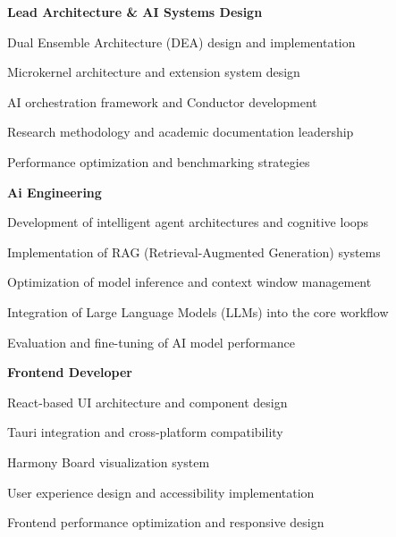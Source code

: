 \begin{description}[leftmargin=4cm,labelwidth=3.5cm]
    \item[\textbf{AMR MUHMAED FATHY}] \textbf{Lead Architecture \& AI Systems Design}
    \begin{compactlist}
        \item Dual Ensemble Architecture (DEA) design and implementation
        \item Microkernel architecture and extension system design
        \item AI orchestration framework and Conductor development
        \item Research methodology and academic documentation leadership
        \item Performance optimization and benchmarking strategies
    \end{compactlist}
    
    \item[\textbf{Mostafa Mohamed Abdullah Ali}] \textbf{Ai Engineering}
    \begin{compactlist}
        \item Development of intelligent agent architectures and cognitive loops
        \item Implementation of RAG (Retrieval-Augmented Generation) systems
        \item Optimization of model inference and context window management
        \item Integration of Large Language Models (LLMs) into the core workflow
        \item Evaluation and fine-tuning of AI model performance
    \end{compactlist}
    
    \item[\textbf{Mahmoud Emad Khairy}] \textbf{Frontend Developer}
    \begin{compactlist}
        \item React-based UI architecture and component design
        \item Tauri integration and cross-platform compatibility
        \item Harmony Board visualization system
        \item User experience design and accessibility implementation
        \item Frontend performance optimization and responsive design
    \end{compactlist}
    

\end{description}

